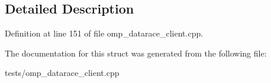 \subsection{Detailed Description}


Definition at line 151 of file omp\-\_\-datarace\-\_\-client.\-cpp.



The documentation for this struct was generated from the following file\-:\begin{DoxyCompactItemize}
\item 
tests/omp\-\_\-datarace\-\_\-client.\-cpp\end{DoxyCompactItemize}
